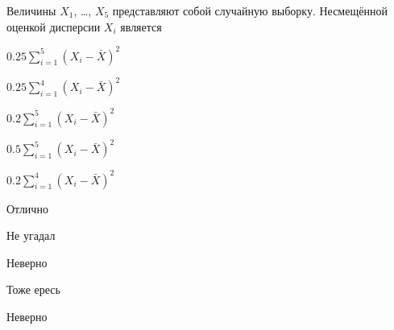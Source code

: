 
\begin{question}
Величины \(X_1\), \ldots, \(X_{5}\) представляют собой случайную
выборку. Несмещённой оценкой дисперсии \(X_i\) является
\begin{answerlist}
  \item \(0.25\sum_{i=1}^{5}(X_i - \bar X)^2\)
  \item \(0.25\sum_{i=1}^{4}(X_i - \bar X)^2\)
  \item \(0.2\sum_{i=1}^{5}(X_i - \bar X)^2\)
  \item \(0.5\sum_{i=1}^{5}(X_i - \bar X)^2\)
  \item \(0.2\sum_{i=1}^{4}(X_i - \bar X)^2\)
\end{answerlist}
\end{question}

\begin{solution}
\begin{answerlist}
  \item Отлично
  \item Не угадал
  \item Неверно
  \item Тоже ересь
  \item Неверно
\end{answerlist}
\end{solution}

